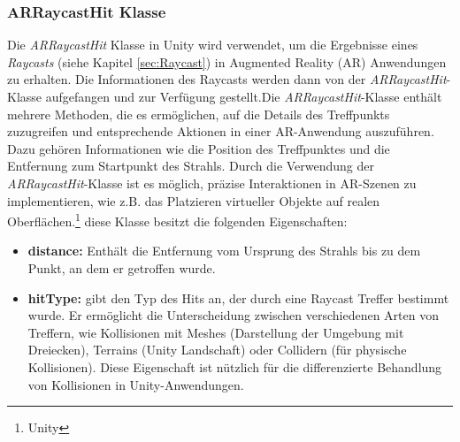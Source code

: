 \subsubsection{\label{sec:ARRaycastHit}ARRaycastHit Klasse}
Die \textit{ARRaycastHit} Klasse in Unity wird verwendet, um die Ergebnisse eines \textit{Raycasts} (siehe Kapitel \ref{sec:Raycast}) in Augmented Reality
(AR) Anwendungen zu erhalten. Die Informationen des Raycasts werden dann von der \textit{ARRaycastHit}-Klasse
aufgefangen und zur Verfügung gestellt.Die \textit{ARRaycastHit}-Klasse enthält mehrere Methoden, die es ermöglichen, auf
die Details des Treffpunkts zuzugreifen und entsprechende Aktionen in einer AR-Anwendung auszuführen. Dazu gehören Informationen
wie die Position des Treffpunktes und die Entfernung zum Startpunkt des Strahls. Durch die Verwendung der \textit{ARRaycastHit}-Klasse
ist es möglich, präzise Interaktionen in AR-Szenen zu implementieren, wie z.B. das Platzieren virtueller Objekte auf
realen Oberflächen.\protect\footnote{Unity\cite{ARRaycastHit}} diese Klasse besitzt die folgenden Eigenschaften:
\begin{itemize}
    \item \textbf{distance: } Enthält die Entfernung vom Ursprung des Strahls bis zu dem Punkt, an dem er getroffen wurde.

    \item \textbf{hitType: } gibt den Typ des Hits an, der durch eine Raycast Treffer bestimmt wurde. Er ermöglicht die Unterscheidung zwischen verschiedenen Arten von Treffern, wie Kollisionen mit Meshes (Darstellung der Umgebung mit Dreiecken), Terrains (Unity Landschaft) oder Collidern (für physische Kollisionen). Diese Eigenschaft ist nützlich für die differenzierte Behandlung von Kollisionen in Unity-Anwendungen.
\end{itemize}

